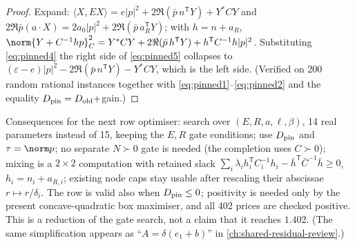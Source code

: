 \begin{proof}Expand: $\langle X,EX\rangle=e|p|^2+2\Re(\bar p\,n^{\mathsf T}Y)+Y^*CY$ and $2\Re\bar p(a\cdot X)=2a_0|p|^2+2\Re(\bar p\,a_R^{\mathsf T}Y)$; with $h=n+a_R$,
$\norm{Y+C^{-1}hp}_C^2=Y^*CY+2\Re(\bar p\,h^{\mathsf T}Y)+h^{\mathsf T}C^{-1}h|p|^2$. Substituting \eqref{eq:pinned4} the right side of \eqref{eq:pinned5} collapses to
$(\varepsilon-e)|p|^2-2\Re(\bar p\,n^{\mathsf T}Y)-Y^*CY$, which is the left side. (Verified on 200 random rational instances together with \eqref{eq:pinned1}--\eqref{eq:pinned2} and the
equality $D_{\rm pin}=D_{\rm old}+$gain.)\end{proof}
Consequences for the next row optimiser: search over $(E,R,a,\ell,\beta)$, 14 real parameters instead of 15, keeping the $E,R$ gate conditions; use $D_{\rm pin}$ and $\tau=\norm p$; no separate
$N\succ0$ gate is needed (the completion uses $C\succ0$); mixing is a $2\times2$ computation with retained slack $\sum_i\lambda_ih_i^{\mathsf T}C_i^{-1}h_i-\bar h^{\mathsf T}\bar C^{-1}\bar h\ge0$,
$h_i=n_i+a_{R,i}$; existing node caps stay usable after rescaling their abscissae $r\mapsto r/\delta_i$. The row is valid also when $D_{\rm pin}\le0$; positivity is needed only by the present
concave-quadratic box maximiser, and all 402 prices are checked positive. This is a reduction of the gate search, not a claim that it reaches $1.402$. (The same simplification appears as
``$A=\delta(e_1+b)$'' in \autoref{ch:shared-residual-review}.)


